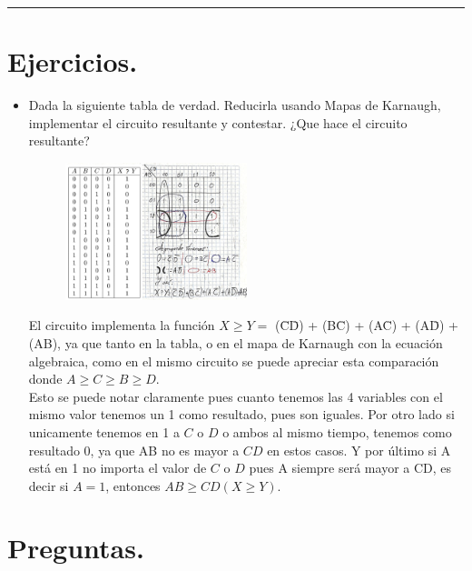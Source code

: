 \documentclass[12pt,letterpaper]{article}
\begin{document}
\bigskip
\hrule height 0.1pt
\bigskip

\section*{Ejercicios.}

\begin{itemize}
\item Dada la siguiente tabla de verdad. Reducirla usando Mapas de Karnaugh, implementar el circuito resultante y contestar. ¿Que hace el circuito resultante?
  
  \begin{figure}[H]
    \centering
      \includegraphics[width=0.5\textwidth]{ejercicio.png}
  \end{figure}
  
  El circuito implementa la funci\'{o}n $X \geq Y =$ (\={C}\={D}) + (B\={C}) + (A\={C}) + (A\={D}) + (AB), ya que tanto en la tabla, o en el mapa de Karnaugh con la ecuaci\'{o}n algebraica, como en el mismo circuito se puede apreciar esta comparaci\'{o}n donde $A \geq C \geq B \geq D$.\\
  Esto se puede notar claramente pues cuanto tenemos las 4 variables con el mismo valor tenemos un 1 como resultado, pues son iguales. Por otro lado si unicamente tenemos en 1 a $C$ o $D$ o ambos al mismo tiempo, tenemos como resultado 0, ya que AB no es mayor a $CD$ en estos casos. Y por \'{u}ltimo si A est\'{a} en 1 no importa el valor de $C$ o $D$ pues A siempre ser\'{a} mayor a CD, es decir si $A = 1$, entonces $AB \geq CD (X \geq Y)$.
\end{itemize}

\bigskip

\section*{Preguntas.}
\end{document}
